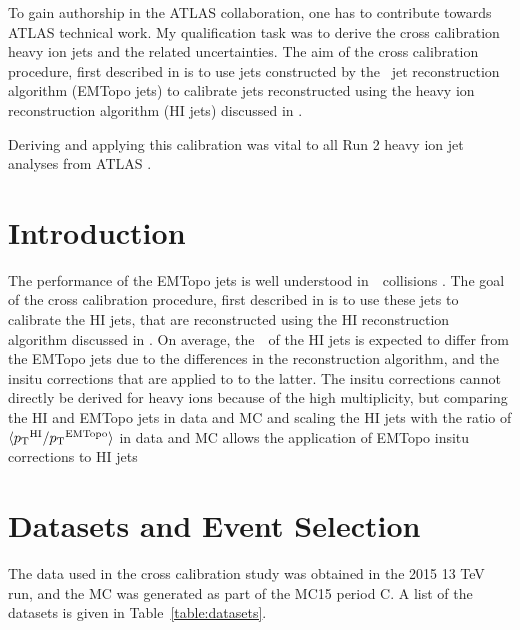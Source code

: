 

To gain authorship in the ATLAS collaboration, one has to contribute towards ATLAS technical work. My qualification task was to derive the cross calibration heavy ion jets and the related uncertainties. The aim of the cross calibration procedure, first described in \cite{xcalib_run1} is to use jets constructed by the \pp\ jet reconstruction algorithm (EMTopo jets) \cite{Aad:pp_jes, Aad:pp_algo, Aaboud:2017jcu} to calibrate jets reconstructed using the heavy ion reconstruction algorithm (HI jets) discussed in \cite{Aad:hi_jets}.

Deriving and applying this calibration was vital to all Run 2 heavy ion jet analyses from ATLAS \cite{ATLAS-CONF-2017-005, ATLAS-CONF-2017-004, ATLAS-CONF-2017-012, ATLAS-CONF-2017-009, ATLAS-CONF-2016-110}.


\section{Introduction}
\label{sec:qual_intro}

The performance of the EMTopo jets is well understood in\ \pp \ collisions \cite{Aad:pp_jes} \cite{Aad:pp_algo}. The goal of the cross calibration procedure, first described in \cite{xcalib_run1} is to use these jets to calibrate the HI jets, that are reconstructed using the HI reconstruction algorithm discussed in \cite{Aad:hi_jets}. On average, the\ \pt \ of the HI jets is expected to differ from the EMTopo jets due to the differences in the reconstruction algorithm, and the insitu corrections that are applied to to the latter. The insitu corrections cannot directly be derived for heavy ions because of the high multiplicity, but comparing the HI and EMTopo jets in data and MC and scaling the HI jets with the ratio of $\langle \mbox{$p_{\mathrm{T}}$} ^{\mathrm{HI}} / \mbox{$p_{\mathrm{T}}$}^{\text{EMTopo}} \rangle$ in data and MC allows the application of EMTopo insitu corrections to HI jets \cite{xcalib_run1}

\section{Datasets and Event Selection}
\label{sec:qual_datasets}
The data used in the cross calibration study was obtained in the 2015 13 TeV run, and the MC was generated as part of the MC15 period C. A list of the datasets is given in Table~\ref{table:datasets}.



